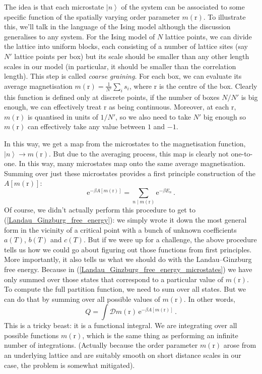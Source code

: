 \documentclass{article}
\theoremstyle{plain}\theoremheaderfont{\normalfont\bfseries}\theorembodyfont{\rmfamily}\theoremseparator{.}\newtheorem*{thm}{Theorem}\newtheorem*{law}{Law}\newtheorem*{pos}{Postulate}
\numberwithin{equation}{section}
\newcommand{\ee}{\mathrm{e}}
\newcommand{\ket}[1]{\left| #1 \right\rangle}
\newcommand{\vb}[1]{\bm{\mathrm{#1}}}
\begin{document}
    The idea is that each microstate \(\ket{n}\) of the system can be associated to some specific function of the spatially varying order parameter \(m(\vb{r})\). To illustrate this, we'll talk in the language of the Ising model although the discussion generalises to any system. For the Ising model of \(N\) lattice points, we can divide the lattice into uniform blocks, each consisting of a number of lattice sites (say \(N'\) lattice points per box) but its scale should be smaller than any other length scales in our model (in particular, it should be smaller than the correlation length). This step is called \textit{coarse graining}. For each box, we can evaluate its average magnetisation \(m(\vb{r})=\frac{1}{N'}\sum_i s_i\), where \(\vb{r}\) is the centre of the box. Clearly this function is defined only at discrete points, if the number of boxes \(N/N'\) is big enough, we can effectively treat \(\vb{r}\) as being continuous. Moreover, at each \(\vb{r}\), \(m(\vb{r})\) is quantised in units of \(1/N'\), so we also need to take \(N'\) big enough so \(m(\vb{r})\) can effectively take any value between \(1\) and \(-1\).
    
    In this way, we get a map from the microstates to the magnetisation function, \(\ket{n}\to m(\vb{r})\). But due to the averaging process, this map is clearly not one-to-one. In this way, many microstates map onto the same average magnetisation. Summing over just these microstates provides a first principle construction of the \(A[m(\vb{r})]\):
    \begin{equation}\label{Landau_Ginzburg_free_energy_microstates}
        \ee^{-\beta A[m(\vb{r})]}=\sum_{n\mid m(\vb{r})}\ee^{-\beta E_n}\,.
    \end{equation}
    Of course, we didn't actually perform this procedure to get to (\ref{Landau_Ginzburg_free_energy}): we simply wrote it down the most general form in the vicinity of a critical point with a bunch of unknown coefficients \(a(T)\), \(b(T)\) and \(c(T)\). But if we were up for a challenge, the above procedure tells us how we could go about figuring out those functions from first principles. More importantly, it also tells us what we should do with the Landau--Ginzburg free energy. Because in (\ref{Landau_Ginzburg_free_energy_microstates}) we have only summed over those states that correspond to a particular value of \(m(\vb{r})\). To compute the full partition function, we need to sum over all states. But we can do that by summing over all possible values of \(m(\vb{r})\). In other words,
    \begin{equation}\label{partition_function_functional_integral}
        Q=\int\mathcal{D}m(\vb{r})\, \ee^{-\beta A[m(\vb{r})]}\,.
    \end{equation}
    This is a tricky beast: it is a functional integral. We are integrating over all possible functions \(m(\vb{r})\), which is the same thing as performing an infinite number of integrations. (Actually because the order parameter \(m(\vb{r})\) arose from an underlying lattice and are suitably smooth on short distance scales in our case, the problem is somewhat mitigated).
\end{document}
